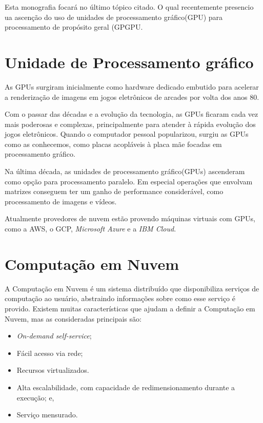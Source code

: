 Esta monografia focará no último tópico citado. O qual recentemente presencio ua ascenção do uso de unidades de processamento gráfico(\acrfull{GPU}) para processamento de propósito geral (\acrfull{GPGPU}\cite{Dimitrov:2009:USA:1513895.1513907}\cite{Yang:2010:GCM:1809028.1806606}. 

\section{Unidade de Processamento gráfico}

As \acrshort{GPU}s surgiram inicialmente como hardware dedicado embutido para acelerar a renderização de imagens em jogos eletrônicos de arcades por volta dos anos 80\cite{1156160}.

Com o passar das décadas e a evolução da tecnologia, as \acrshort{GPU}s ficaram cada vez mais poderosas e complexas, principalmente para atender à rápida evolução dos jogos eletrônicos. Quando o computador pessoal popularizou, surgiu as \acrshort{GPU}s como as conhecemos, como placas acopláveis à placa mãe focadas em processamento gráfico.

Na última década, as unidades de processamento gráfico(\acrshort{GPU}s) ascenderam como opção para processamento paralelo. Em especial operações que envolvam matrizes conseguem ter um ganho de performance considerável\cite{Dalton:2015:OSM:2835205.2699470}, como processamento de imagens e vídeos\cite{Mulligan:2012:GSE:2168556.2168612}.

Atualmente provedores de nuvem estão provendo máquinas virtuais com \acrshort{GPU}s, como a \acrfull{AWS}\cite{AWS_GPU}, o \acrfull{GCP}\cite{Google_Cloud_GPU}, \textit{Microsoft Azure}\cite{Azure_GPU} e a \textit{IBM Cloud}\cite{IBM_Cloud_GPU}.

\section{Computação em Nuvem}

A Computação em Nuvem é um sistema distribuído que disponibiliza serviços de computação ao usuário, abstraindo informações sobre como esse serviço é provido. Existem muitas características que ajudam a definir a Computação em Nuvem, mas as consideradas principais são\cite{NIST_CLOUD_DEFINITION}:
\begin{itemize}
	\item \textit{On-demand self-service};
	\item Fácil acesso via rede;
	\item Recursos virtualizados.
	\item Alta escalabilidade, com capacidade de redimensionamento durante a execução; e,
	\item Serviço mensurado.
\end{itemize}

